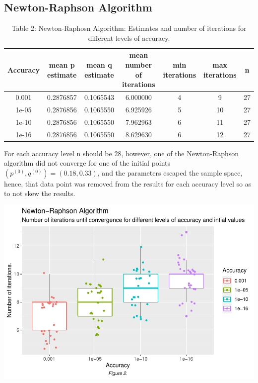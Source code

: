 \documentclass[]{article}
\begin{document}
\subsection{Newton-Raphson Algorithm}\label{newton-raphson-algorithm}

\begin{table}[t]

\caption{\label{tab:unnamed-chunk-4}Table 2: Newton-Raphosn Algorithm: Estimates and number of iterations for different levels of accuracy.}
\centering
\begin{tabular}{c|c|c|c|c|c|c}
\hline
Accuracy & mean p estimate & mean q estimate & mean number of iterations & min iterations & max iterations & n\\
\hline
0.001 & 0.2876857 & 0.1065543 & 6.000000 & 4 & 9 & 27\\
\hline
1e-05 & 0.2876856 & 0.1065550 & 6.925926 & 5 & 10 & 27\\
\hline
1e-10 & 0.2876856 & 0.1065550 & 7.962963 & 6 & 11 & 27\\
\hline
1e-16 & 0.2876856 & 0.1065550 & 8.629630 & 6 & 12 & 27\\
\hline
\end{tabular}
\end{table}

For each accuracy level n should be 28, however, one of the
Newton-Raphson algorithm did not converge for one of the initial points
\((p^{(0)}, q^{(0)}) = (0.18 , 0.33 )\), and the parameters escaped the
sample space, hence, that data point was removed from the results for
each accuracy level so as to not skew the results.

\includegraphics{Rmarkdown_Faizan_HW1_CHL5224_Statistical_Genetics_files/figure-latex/unnamed-chunk-5-1.pdf}
\end{document}
